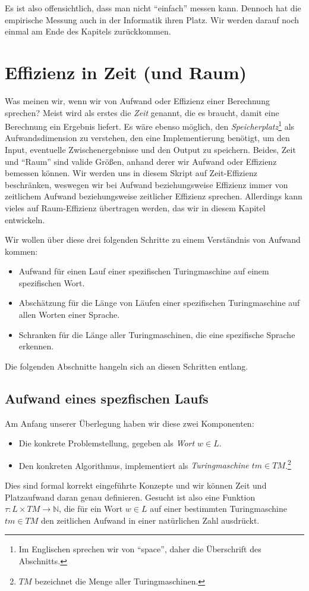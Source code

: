 Es ist also offensichtlich,
dass man nicht ``einfach'' messen kann.
Dennoch hat die empirische Messung auch in der Informatik ihren Platz.
Wir werden darauf noch einmal am Ende des Kapitels zurückkommen.

\section{Effizienz in Zeit (und Raum)}

Was meinen wir, wenn wir von Aufwand oder Effizienz einer Berechnung sprechen?
Meist wird als erstes die \emph{Zeit} genannt,
die es braucht,
damit eine Berechnung ein Ergebnis liefert.
Es wäre ebenso möglich,
den \emph{Speicherplatz}\footnote{
    Im Englischen sprechen wir von ``space'', daher die Überschrift des Abschnitts.}
als Aufwandsdimension zu verstehen,
den eine Implementierung benötigt,
um den Input,
eventuelle Zwischenergebnisse
und den Output zu speichern.
Beides, Zeit und ``Raum'' sind valide Größen,
anhand derer wir Aufwand oder Effizienz bemessen können.
Wir werden uns in diesem Skript auf Zeit-Effizienz beschränken,
weswegen wir bei Aufwand beziehungsweise Effizienz immer von
zeitlichem Aufwand beziehungsweise zeitlicher Effizienz sprechen.
Allerdings kann vieles auf Raum-Effizienz übertragen werden,
das wir in diesem Kapitel entwickeln.

Wir wollen über diese drei folgenden Schritte zu einem Verständnis von Aufwand kommen:
\begin{itemize}
    \item Aufwand für einen Lauf einer spezifischen Turingmaschine auf einem spezifischen Wort.
    \item Abschätzung für die Länge von Läufen einer spezifischen Turingmaschine
        auf allen Worten einer Sprache.
    \item Schranken für die Länge aller Turingmaschinen, die eine spezifische Sprache erkennen.
\end{itemize}

Die folgenden Abschnitte hangeln sich an diesen Schritten entlang.

\subsection{Aufwand eines spezfischen Laufs}
Am Anfang unserer Überlegung haben wir diese zwei Komponenten:
\begin{itemize}
    \item Die konkrete Problemstellung, gegeben als \emph{Wort $w \in L$}.
    \item Den konkreten Algorithmus,
        implementiert als \emph{Turingmaschine $tm \in TM$}.\footnote{
            $TM$ bezeichnet die Menge aller Turingmaschinen.}
\end{itemize}
Dies sind formal korrekt eingeführte Konzepte
und wir können Zeit und Platzaufwand daran genau definieren.
Gesucht ist also eine Funktion $\tau: L \times TM \rightarrow \mathbb{N}$,
die für ein Wort $w \in L$ auf einer bestimmten Turingmaschine $tm \in TM$
den zeitlichen Aufwand in einer natürlichen Zahl ausdrückt.

